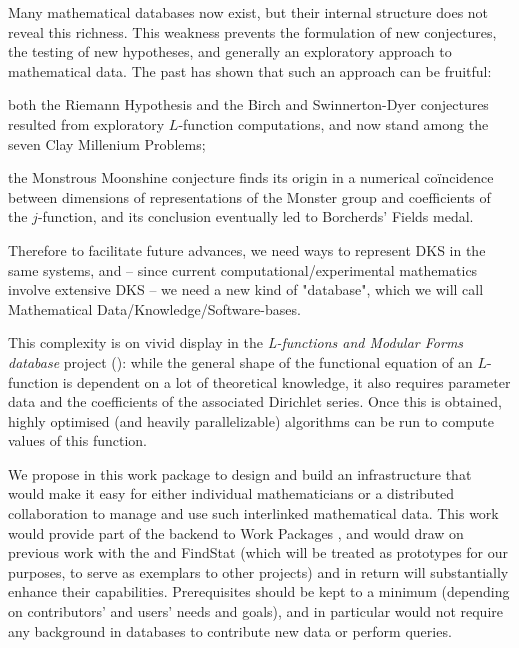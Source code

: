 \begin{workpackage}[id=dksbases,wphases=1-48!.5,
  title=Data/Knowledge/Software-Bases,lead=JU,
  ZHRM=12,JURM=36,USHRM=12,UWRM=3,SARM=10]
\begin{wpdescription}
  Many mathematical databases now exist, but their internal structure does not reveal this
  richness. This weakness prevents the formulation of new conjectures, the testing of new
  hypotheses, and generally an exploratory approach to mathematical data. The past has
  shown that such an approach can be fruitful:
  \begin{compactitem}
  \item both the Riemann Hypothesis and the Birch and Swinnerton-Dyer conjectures resulted
    from exploratory $L$-function computations, and now stand among the seven Clay
    Millenium Problems;
  \item the Monstrous Moonshine conjecture finds its origin in a numerical co\"incidence
    between dimensions of representations of the Monster group and coefficients of the
    $j$-function, and its conclusion eventually led to Borcherds' Fields medal.
  \end{compactitem}

  Therefore to facilitate future advances, we need ways to represent DKS in the same
  systems, and -- since current computational/experimental mathematics involve extensive
  DKS -- we need a new kind of "database", which we will call Mathematical
  Data/Knowledge/Software-bases.

  This complexity is on vivid display in the \emph{L-functions and Modular Forms database}
  project (\LMFDB): while the general shape of the functional equation of an $L$-function
  is dependent on a lot of theoretical knowledge, it also requires parameter data and the
  coefficients of the associated Dirichlet series. Once this is obtained, highly optimised
  (and heavily parallelizable) algorithms can be run to compute values of this function.

  We propose in this work package to design and build an infrastructure that would make it
  easy for either individual mathematicians or a distributed collaboration to manage and
  use such interlinked mathematical data. This work would provide part of the backend to
  Work Packages , and would draw on previous work
  with the \LMFDB and FindStat (which will be treated as prototypes for our purposes, to
  serve as exemplars to other projects) and in return will substantially enhance their
  capabilities. Prerequisites should be kept to a minimum (depending on contributors' and
  users' needs and goals), and in particular would not require any background in databases
  to contribute new data or perform queries.
\end{wpdescription}


\end{workpackage}
